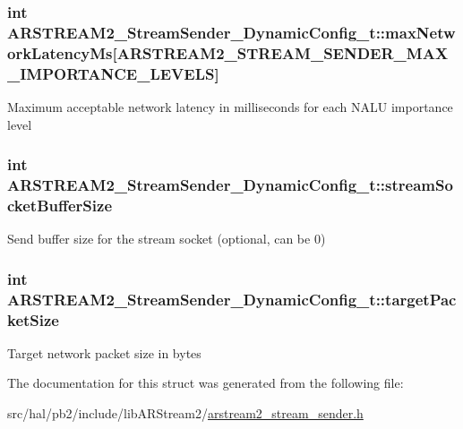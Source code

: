 \subsubsection[{\texorpdfstring{max\+Network\+Latency\+Ms}{maxNetworkLatencyMs}}]{\setlength{\rightskip}{0pt plus 5cm}int A\+R\+S\+T\+R\+E\+A\+M2\+\_\+\+Stream\+Sender\+\_\+\+Dynamic\+Config\+\_\+t\+::max\+Network\+Latency\+Ms\mbox{[}{\bf A\+R\+S\+T\+R\+E\+A\+M2\+\_\+\+S\+T\+R\+E\+A\+M\+\_\+\+S\+E\+N\+D\+E\+R\+\_\+\+M\+A\+X\+\_\+\+I\+M\+P\+O\+R\+T\+A\+N\+C\+E\+\_\+\+L\+E\+V\+E\+LS}\mbox{]}}\hypertarget{struct_a_r_s_t_r_e_a_m2___stream_sender___dynamic_config__t_aeeb00076e0adec8902d4e712b0b80ace}{}\label{struct_a_r_s_t_r_e_a_m2___stream_sender___dynamic_config__t_aeeb00076e0adec8902d4e712b0b80ace}
Maximum acceptable network latency in milliseconds for each N\+A\+LU importance level 
\subsubsection[{\texorpdfstring{stream\+Socket\+Buffer\+Size}{streamSocketBufferSize}}]{\setlength{\rightskip}{0pt plus 5cm}int A\+R\+S\+T\+R\+E\+A\+M2\+\_\+\+Stream\+Sender\+\_\+\+Dynamic\+Config\+\_\+t\+::stream\+Socket\+Buffer\+Size}\hypertarget{struct_a_r_s_t_r_e_a_m2___stream_sender___dynamic_config__t_a9cf6bbe82c5525764f8fd5d100549306}{}\label{struct_a_r_s_t_r_e_a_m2___stream_sender___dynamic_config__t_a9cf6bbe82c5525764f8fd5d100549306}
Send buffer size for the stream socket (optional, can be 0) 
\subsubsection[{\texorpdfstring{target\+Packet\+Size}{targetPacketSize}}]{\setlength{\rightskip}{0pt plus 5cm}int A\+R\+S\+T\+R\+E\+A\+M2\+\_\+\+Stream\+Sender\+\_\+\+Dynamic\+Config\+\_\+t\+::target\+Packet\+Size}\hypertarget{struct_a_r_s_t_r_e_a_m2___stream_sender___dynamic_config__t_a3f6f15a150d59956f6ef79fc00c717da}{}\label{struct_a_r_s_t_r_e_a_m2___stream_sender___dynamic_config__t_a3f6f15a150d59956f6ef79fc00c717da}
Target network packet size in bytes 

The documentation for this struct was generated from the following file\+:\begin{DoxyCompactItemize}
\item 
src/hal/pb2/include/lib\+A\+R\+Stream2/\hyperlink{arstream2__stream__sender_8h}{arstream2\+\_\+stream\+\_\+sender.\+h}\end{DoxyCompactItemize}
